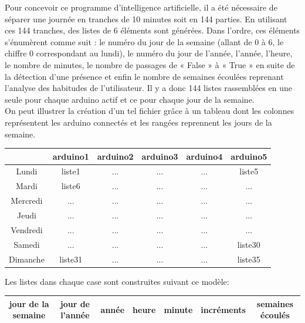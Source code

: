\documentclass[12pt]{report}
\begin{document}
\noindent
Pour concevoir ce programme d'intelligence artificielle, il a été nécessaire de séparer une journée en tranches de 10 minutes soit en 144 parties. En utilisant ces 144 tranches, des listes de 6 éléments sont générées. Dans l’ordre, ces éléments s'énumèrent comme suit : le numéro du jour de la semaine (allant de 0 à 6, le chiffre 0 correspondant au lundi), le numéro du jour de l’année, l’année, l’heure, le nombre de minutes, le nombre de passages de « False » à « True » en suite de la détection d'une présence et enfin le nombre de semaines écoulées reprenant l’analyse des habitudes de l’utilisateur. Il y a donc 144 listes rassemblées en une seule pour chaque arduino actif et ce pour chaque jour de la semaine.\\

\noindent
On peut illustrer la création d'un tel fichier grâce à un tableau dont les colonnes représentent les arduino connectés et les rangées reprennent les jours de la semaine.
\vspace{0.2cm}
\begin{center}
\begin{tabular}{|c|c|c|c|c|c|}
\hline
{}&{arduino1}&{arduino2}&{arduino3}&{arduino4}&{arduino5}\\
\hline
{Lundi}&{liste1}&{...}&{...}&{...}&{liste5}\\
\hline
{Mardi}&{liste6}&{...}&{...}&{...}&{...}\\
\hline
{Mercredi}&{...}&{...}&{...}&{...}&{...}\\
\hline
{Jeudi}&{...}&{...}&{...}&{...}&{...}\\
\hline
{Vendredi}&{...}&{...}&{...}&{...}&{...}\\
\hline
{Samedi}&{...}&{...}&{...}&{...}&{liste30}\\
\hline
{Dimanche}&{liste31}&{...}&{...}&{...}&{liste35}\\
\hline
\end{tabular}
\end{center}
\vspace{0.5cm}
Les listes dans chaque case sont construites suivant ce modèle:
\vspace{0.2cm}
\begin{center}
\begin{tabular}{|c|c|c|c|c|c|c|}
\hline
{jour de la semaine}&{jour de l'année}&{année}&{heure}&{minute}&{incréments}& {semaines écoulés}\\
\hline
\end{tabular}
\end{center}
\vspace{0.2cm}
\end{document}
